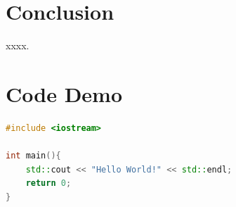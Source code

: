 \documentclass{article}
\begin{document}
\section{Conclusion}

xxxx.

\section{Code Demo}

\begin{lstlisting}[style=simpleStyle, caption=Demo (C++), language=c++, label=lst:cpp]
#include <iostream>

int main(){
    std::cout << "Hello World!" << std::endl;
    return 0;
}
\end{lstlisting}


\end{document}
